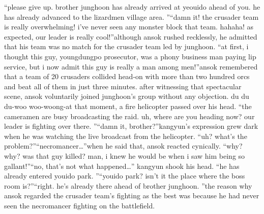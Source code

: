 “please give up.
 brother junghoon has already arrived at yeouido ahead of you.
 he has already advanced to the lizardmen village area.
”“damn it! the crusader team is really overwhelming! i’ve never seen any monster block that team.
 hahaha! as expected, our leader is really cool!”although ansok rushed recklessly, he admitted that his team was no match for the crusader team led by junghoon.
“at first, i thought this guy, youngdungpo prosecutor, was a phony business man paying lip service, but i now admit this guy is really a man among men!”ansok remembered that a team of 20 crusaders collided head-on with more than two hundred orcs and beat all of them in just three minutes.
after witnessing that spectacular scene, ansok voluntarily joined junghoon’s group without any objection.
du du du-woo woo-woong-at that moment, a fire helicopter passed over his head.
“the cameramen are busy broadcasting the raid.
 uh, where are you heading now? our leader is fighting over there.
”“damn it, brother?”kangyun’s expression grew dark when he was watching the live broadcast from the helicopter.
“uh? what’s the problem?”“necromancer…”when he said that, ansok reacted cynically.
“why? why? was that guy killed? man, i knew he would be when i saw him being so gallant!”“no, that’s not what happened…” kangyun shook his head.
 “he has already entered youido park.
”“youido park? isn’t it the place where the boss room is?”“right.
 he’s already there ahead of brother junghoon.
”the reason why ansok regarded the crusader team’s fighting as the best was because he had never seen the necromancer fighting on the battlefield.


 